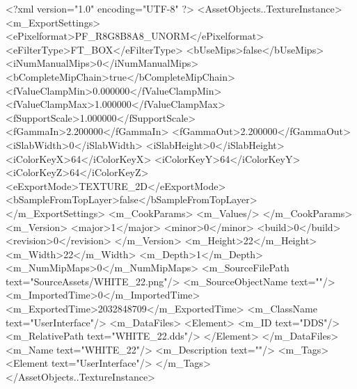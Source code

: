 <?xml version="1.0" encoding="UTF-8" ?>
<AssetObjects..TextureInstance>
	<m_ExportSettings>
		<ePixelformat>PF_R8G8B8A8_UNORM</ePixelformat>
		<eFilterType>FT_BOX</eFilterType>
		<bUseMips>false</bUseMips>
		<iNumManualMips>0</iNumManualMips>
		<bCompleteMipChain>true</bCompleteMipChain>
		<fValueClampMin>0.000000</fValueClampMin>
		<fValueClampMax>1.000000</fValueClampMax>
		<fSupportScale>1.000000</fSupportScale>
		<fGammaIn>2.200000</fGammaIn>
		<fGammaOut>2.200000</fGammaOut>
		<iSlabWidth>0</iSlabWidth>
		<iSlabHeight>0</iSlabHeight>
		<iColorKeyX>64</iColorKeyX>
		<iColorKeyY>64</iColorKeyY>
		<iColorKeyZ>64</iColorKeyZ>
		<eExportMode>TEXTURE_2D</eExportMode>
		<bSampleFromTopLayer>false</bSampleFromTopLayer>
	</m_ExportSettings>
	<m_CookParams>
		<m_Values/>
	</m_CookParams>
	<m_Version>
		<major>1</major>
		<minor>0</minor>
		<build>0</build>
		<revision>0</revision>
	</m_Version>
	<m_Height>22</m_Height>
	<m_Width>22</m_Width>
	<m_Depth>1</m_Depth>
	<m_NumMipMaps>0</m_NumMipMaps>
	<m_SourceFilePath text="SourceAssets/WHITE_22.png"/>
	<m_SourceObjectName text=""/>
	<m_ImportedTime>0</m_ImportedTime>
	<m_ExportedTime>2032848709</m_ExportedTime>
	<m_ClassName text="UserInterface"/>
	<m_DataFiles>
		<Element>
			<m_ID text="DDS"/>
			<m_RelativePath text="WHITE_22.dds"/>
		</Element>
	</m_DataFiles>
	<m_Name text="WHITE_22"/>
	<m_Description text=""/>
	<m_Tags>
		<Element text="UserInterface"/>
	</m_Tags>
</AssetObjects..TextureInstance>

